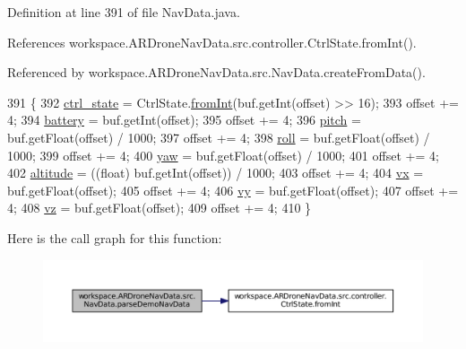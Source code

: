 Definition at line 391 of file Nav\+Data.\+java.



References workspace.\+A\+R\+Drone\+Nav\+Data.\+src.\+controller.\+Ctrl\+State.\+from\+Int().



Referenced by workspace.\+A\+R\+Drone\+Nav\+Data.\+src.\+Nav\+Data.\+create\+From\+Data().


\begin{DoxyCode}
391                                                                      \{
392         \hyperlink{classworkspace_1_1_a_r_drone_nav_data_1_1src_1_1_nav_data_a4dad3c2d984a9b096d1c04f9f0168a54}{ctrl\_state} = CtrlState.\hyperlink{enumworkspace_1_1_a_r_drone_nav_data_1_1src_1_1controller_1_1_ctrl_state_a12e972814c520c7a3da99809b3c7973b}{fromInt}(buf.getInt(offset) >> 16);
393         offset += 4;
394         \hyperlink{classworkspace_1_1_a_r_drone_nav_data_1_1src_1_1_nav_data_a2d1a734f6454ccb88864805f5fb39dec}{battery} = buf.getInt(offset);
395         offset += 4;
396         \hyperlink{classworkspace_1_1_a_r_drone_nav_data_1_1src_1_1_nav_data_acd608bde222fb79f3ecb1eabc0a2a68e}{pitch} = buf.getFloat(offset) / 1000;
397         offset += 4;
398         \hyperlink{classworkspace_1_1_a_r_drone_nav_data_1_1src_1_1_nav_data_a390325d58f9221a7bf863a8df435d7fd}{roll} = buf.getFloat(offset) / 1000;
399         offset += 4;
400         \hyperlink{classworkspace_1_1_a_r_drone_nav_data_1_1src_1_1_nav_data_a59927db835b55d0812e210d40f6469db}{yaw} = buf.getFloat(offset) / 1000;
401         offset += 4;
402         \hyperlink{classworkspace_1_1_a_r_drone_nav_data_1_1src_1_1_nav_data_a43bdb5aecc5a0cbdb6816096634f60df}{altitude} = ((float) buf.getInt(offset)) / 1000;
403         offset += 4;
404         \hyperlink{classworkspace_1_1_a_r_drone_nav_data_1_1src_1_1_nav_data_a184968ef9be9a9f16f29090ebbb1b411}{vx} = buf.getFloat(offset);
405         offset += 4;
406         \hyperlink{classworkspace_1_1_a_r_drone_nav_data_1_1src_1_1_nav_data_a301c734d4cd2475f7a9470074372a6c9}{vy} = buf.getFloat(offset);
407         offset += 4;
408         \hyperlink{classworkspace_1_1_a_r_drone_nav_data_1_1src_1_1_nav_data_a4624d0a93818c81b849a74147cb747cc}{vz} = buf.getFloat(offset);
409         offset += 4;
410     \}
\end{DoxyCode}


Here is the call graph for this function\+:\nopagebreak
\begin{figure}[H]
\begin{center}
\leavevmode
\includegraphics[width=350pt]{classworkspace_1_1_a_r_drone_nav_data_1_1src_1_1_nav_data_a5bf3b738d8cfc76f9e52de7d13c613cf_cgraph}
\end{center}
\end{figure}




